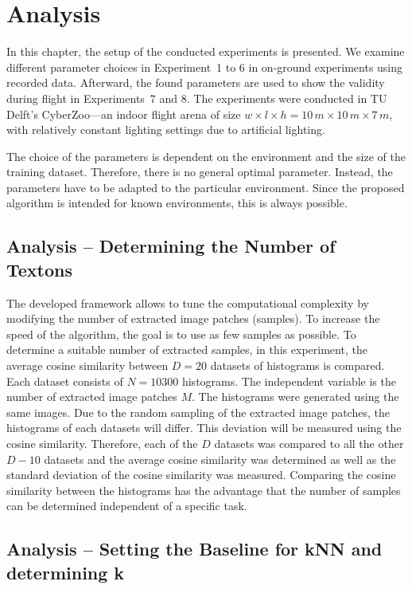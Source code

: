 \chapter{Analysis}
\label{chap:analysis}

In this chapter, the setup of the conducted experiments is
presented. We examine different parameter choices in Experiment~1 to 6
in on-ground experiments using recorded data. Afterward, the found
parameters are used to show the validity during flight in
Experiments~7 and 8. The experiments were conducted in TU Delft's
CyberZoo---an indoor flight arena of size $w \times l \times h = 10\,m
\times10\,m \times 7\,m$, with relatively constant lighting settings
due to artificial lighting.

The choice of the parameters is dependent on the environment and the size of the training dataset. Therefore, there is no general optimal parameter. Instead, the parameters have to be adapted to the particular environment. Since the proposed algorithm is intended for known environments, this is always possible.

\section{Analysis -- Determining the Number of Textons}
\label{sec:numtextons}

The developed framework allows to tune the computational complexity by
modifying the number of extracted image patches (samples). To increase
the speed of the algorithm, the goal is to use as few samples as
possible. To determine a suitable number of extracted samples, in this
experiment, the average cosine similarity between $D = 20$ datasets of
histograms is compared. Each dataset consists of $N = 10300$
histograms. The independent variable is the number of extracted image
patches $M$. The histograms were generated using the same images. Due
to the random sampling of the extracted image patches, the histograms
of each datasets will differ. This deviation will be measured using
the cosine similarity. Therefore, each of the $D$ datasets was
compared to all the other $D - 10$ datasets and the average cosine
similarity was determined as well as the standard deviation of the
cosine similarity was measured. Comparing the cosine similarity
between the histograms has the advantage that the number of samples
can be determined independent of a specific task.

\section{Analysis -- Setting the Baseline for kNN and determining k}
\label{sec:numtextons}

